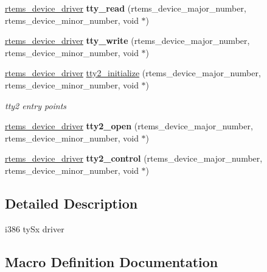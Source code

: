 \begin{DoxyCompactItemize}
\mbox{\hyperlink{group__ClassicStatus_ga545d41846817eaba6143d52ee4d9e9fe}{rtems\+\_\+device\+\_\+driver}} {\bfseries tty\+\_\+read} (rtems\+\_\+device\+\_\+major\+\_\+number, rtems\+\_\+device\+\_\+minor\+\_\+number, void $\ast$)
\item 
\mbox{\label{group__i386__tty_ga0cff8186f71c26de0d2d4989fc887a75}} 
\mbox{\hyperlink{group__ClassicStatus_ga545d41846817eaba6143d52ee4d9e9fe}{rtems\+\_\+device\+\_\+driver}} {\bfseries tty\+\_\+write} (rtems\+\_\+device\+\_\+major\+\_\+number, rtems\+\_\+device\+\_\+minor\+\_\+number, void $\ast$)
\item 
\mbox{\label{group__i386__tty_gaf1727fd0bd4c6e3fb1cd040b753f09dc}} 
\mbox{\hyperlink{group__ClassicStatus_ga545d41846817eaba6143d52ee4d9e9fe}{rtems\+\_\+device\+\_\+driver}} \mbox{\hyperlink{group__i386__tty_gaf1727fd0bd4c6e3fb1cd040b753f09dc}{tty2\+\_\+initialize}} (rtems\+\_\+device\+\_\+major\+\_\+number, rtems\+\_\+device\+\_\+minor\+\_\+number, void $\ast$)
\begin{DoxyCompactList}\small\item\em tty2 entry points \end{DoxyCompactList}\item 
\mbox{\label{group__i386__tty_gacbf5242876ed33e2305be83130a7928b}} 
\mbox{\hyperlink{group__ClassicStatus_ga545d41846817eaba6143d52ee4d9e9fe}{rtems\+\_\+device\+\_\+driver}} {\bfseries tty2\+\_\+open} (rtems\+\_\+device\+\_\+major\+\_\+number, rtems\+\_\+device\+\_\+minor\+\_\+number, void $\ast$)
\item 
\mbox{\label{group__i386__tty_gae4d82eb012b6eb9f913bc976c7d5cb93}} 
\mbox{\hyperlink{group__ClassicStatus_ga545d41846817eaba6143d52ee4d9e9fe}{rtems\+\_\+device\+\_\+driver}} {\bfseries tty2\+\_\+control} (rtems\+\_\+device\+\_\+major\+\_\+number, rtems\+\_\+device\+\_\+minor\+\_\+number, void $\ast$)
\end{DoxyCompactItemize}


\subsection{Detailed Description}
i386 ty\+Sx driver 



\subsection{Macro Definition Documentation}
\mbox{\label{group__i386__tty_gab43827ca3a23def8de4ff4cc4b34475f}} 
